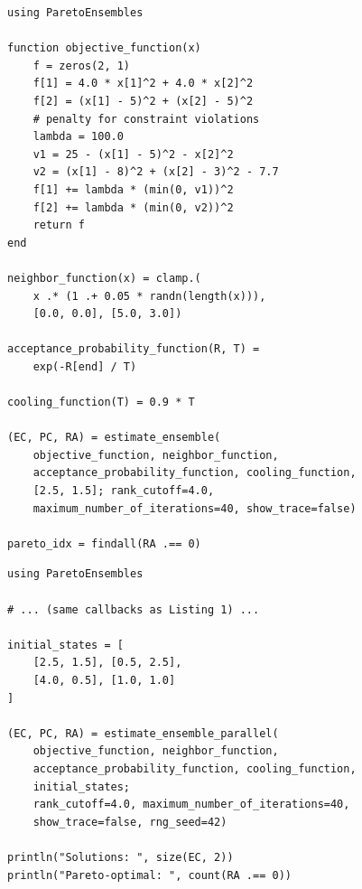 \documentclass[12pt]{article}
\begin{document}
\begin{lstlisting}[caption={Binh--Korn benchmark with ParetoEnsembles.jl.},label={lst:binhkorn}]
using ParetoEnsembles

function objective_function(x)
    f = zeros(2, 1)
    f[1] = 4.0 * x[1]^2 + 4.0 * x[2]^2
    f[2] = (x[1] - 5)^2 + (x[2] - 5)^2
    # penalty for constraint violations
    lambda = 100.0
    v1 = 25 - (x[1] - 5)^2 - x[2]^2
    v2 = (x[1] - 8)^2 + (x[2] - 3)^2 - 7.7
    f[1] += lambda * (min(0, v1))^2
    f[2] += lambda * (min(0, v2))^2
    return f
end

neighbor_function(x) = clamp.(
    x .* (1 .+ 0.05 * randn(length(x))),
    [0.0, 0.0], [5.0, 3.0])

acceptance_probability_function(R, T) =
    exp(-R[end] / T)

cooling_function(T) = 0.9 * T

(EC, PC, RA) = estimate_ensemble(
    objective_function, neighbor_function,
    acceptance_probability_function, cooling_function,
    [2.5, 1.5]; rank_cutoff=4.0,
    maximum_number_of_iterations=40, show_trace=false)

pareto_idx = findall(RA .== 0)
\end{lstlisting}

\begin{lstlisting}[caption={Multi-chain parallel execution on the Binh--Korn problem (requires \texttt{julia -t4}).},label={lst:parallel}]
using ParetoEnsembles

# ... (same callbacks as Listing 1) ...

initial_states = [
    [2.5, 1.5], [0.5, 2.5],
    [4.0, 0.5], [1.0, 1.0]
]

(EC, PC, RA) = estimate_ensemble_parallel(
    objective_function, neighbor_function,
    acceptance_probability_function, cooling_function,
    initial_states;
    rank_cutoff=4.0, maximum_number_of_iterations=40,
    show_trace=false, rng_seed=42)

println("Solutions: ", size(EC, 2))
println("Pareto-optimal: ", count(RA .== 0))
\end{lstlisting}
\end{document}

